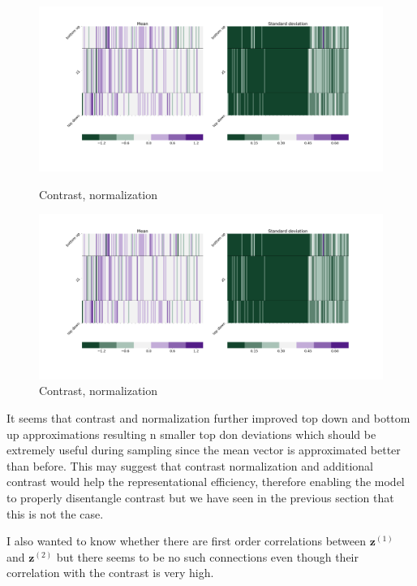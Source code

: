 \documentclass[12pt, english]{article}
\begin{document}
\begin{figure}[H]
  \begin{minipage}{0.5\linewidth}
    \centering
    \includegraphics[width=.75\linewidth]{z1_vis/z1_vis_norm_contrast/16_DenseLinLinLadderVAE_textures_contrastNorm_contrast-stats-1_vector_comparisons_1.png}
    \caption{Contrast, normalization}
    \label{fig:sample-norm-contrast-1}
  \end{minipage}
  \begin{minipage}{0.5\linewidth}
    \centering
    \includegraphics[width=.75\linewidth]{z1_vis/z1_vis_norm_contrast/16_DenseLinLinLadderVAE_textures_contrastNorm_contrast-stats-1_vector_comparisons_1.png}
    \caption{Contrast, normalization}
    \label{fig:sample-norm-contrast-2}
  \end{minipage}
\end{figure}

\vspace{4mm}

\par It seems that contrast and normalization further improved top down and bottom up approximations resulting n smaller top don deviations which should be extremely useful during sampling since the mean vector is approximated better than before. This may suggest that contrast normalization and additional contrast would help the representational efficiency, therefore enabling the model to properly disentangle contrast but we have seen in the previous section that this is not the case.

\vspace{4mm}

\par I also wanted to know whether there are first order correlations between $\bm{z}^{(1)}$ and $\bm{z}^{(2)}$ but there seems to be no such connections even though their correlation with the contrast is very high.
\end{document}

